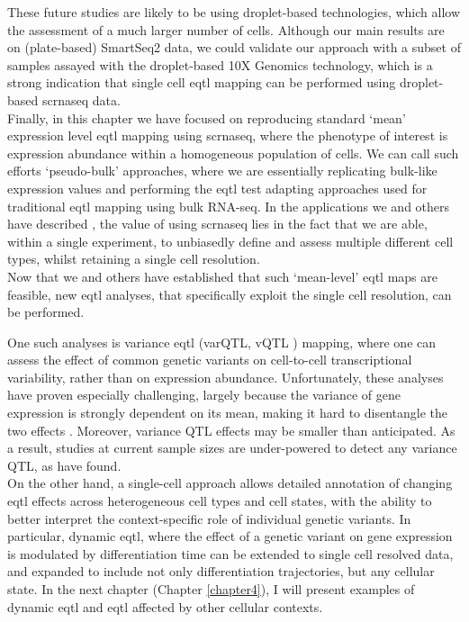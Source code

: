 These future studies are likely to be using droplet-based technologies, which allow the assessment of a much larger number of cells.
Although our main results are on (plate-based) SmartSeq2 data, we could validate our approach with a subset of samples assayed with the droplet-based 10X Genomics technology, which is a strong indication that single cell \gls{eqtl} mapping can be performed using droplet-based \gls{scrnaseq} data. \\

Finally, in this chapter we have focused on reproducing standard `mean' expression level \gls{eqtl} mapping using \gls{scrnaseq}, where the phenotype of interest is expression abundance within a homogeneous population of cells.
We can call such efforts `pseudo-bulk' approaches, where we are essentially replicating bulk-like expression values and performing the \gls{eqtl} test adapting approaches used for traditional \gls{eqtl} mapping using bulk RNA-seq. 
In the applications we and others have described \cite{van2018single,cuomo2020single}, the value of using \gls{scrnaseq} lies in the fact that we are able, within a single experiment, to unbiasedly define and assess multiple different cell types, whilst retaining a single cell resolution.\\

Now that we and others have established that such `mean-level' \gls{eqtl} maps are feasible, new \gls{eqtl} analyses, that specifically exploit the single cell resolution, can be performed.

One such analyses is variance \gls{eqtl} (varQTL, vQTL \cite{ayroles2015behavioral}) mapping, where one can assess the effect of common genetic variants on cell-to-cell transcriptional variability, rather than on expression abundance.
Unfortunately, these analyses have proven especially challenging, largely because the variance of gene expression is strongly dependent on its mean, making it hard to disentangle the two effects \cite{vallejos2016beyond}.
Moreover, variance QTL effects may be smaller than anticipated.
As a result, studies at current sample sizes are under-powered to detect any variance QTL, as 
\cite{sarkar2019discovery} have found. \\

On the other hand, a single-cell approach allows detailed annotation of changing \gls{eqtl} effects across heterogeneous cell types and cell states, with the ability to better interpret the context-specific role of individual genetic variants. 
In particular, dynamic \gls{eqtl}, where the effect of a genetic variant on gene expression is modulated by differentiation time \cite{francesconi2014effects, strober2019dynamic} can be extended to single cell resolved data, and expanded to include not only differentiation trajectories, but any cellular state.
In the next chapter (Chapter 
\ref{chapter4}),
I will present examples of dynamic \gls{eqtl} and \gls{eqtl} affected by other cellular contexts.